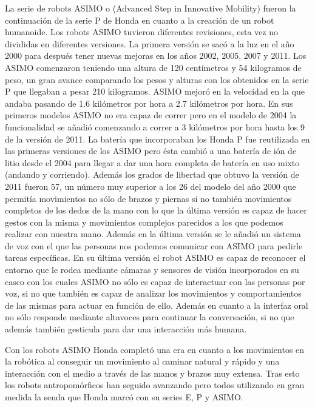 La serie de robots ASIMO o (Advanced Step in Innovative Mobility) fueron la continuación de la serie P de Honda en cuanto a la creación de un robot humanoide. Los robots ASIMO tuvieron diferentes revisiones, esta vez no divididas en diferentes versiones. La primera versión se sacó a la luz en el año 2000 para después tener nuevas mejoras en los años 2002, 2005, 2007 y 2011. Los ASIMO comenzaron teniendo una altura de 120 centímetros y 54 kilogramos de peso, un gran avance comparando los pesos y alturas con los obtenidos en la serie P que llegaban a pesar 210 kilogramos. ASIMO mejoró en la velocidad en la que andaba pasando de 1.6 kilómetros por hora a 2.7 kilómetros por hora. En sus primeros modelos ASIMO no era capaz de correr pero en el modelo de 2004 la funcionalidad se añadió comenzando a correr a 3 kilómetros por hora hasta los 9 de la versión de 2011. La batería que incorporaban los Honda P fue reutilizada en las primeras versiones de los ASIMO pero ésta cambió a una batería de ión de litio desde el 2004 para llegar a dar una hora completa de batería en uso mixto (andando y corriendo). Además los grados de libertad que obtuvo la versión de 2011 fueron 57, un número muy superior a los 26 del modelo del año 2000 que permitía movimientos no sólo de brazos y piernas si no también movimientos completos de los dedos de la mano con lo que la última versión es capaz de hacer gestos con la misma y movimientos complejos parecidos a los que podemos realizar con nuestra mano. Además en la última versión se le añadió un sistema de voz con el que las personas nos podemos comunicar con ASIMO para pedirle tareas específicas. En su última versión el robot ASIMO es capaz de reconocer el entorno que le rodea mediante cámaras y sensores de visión incorporados en su casco con los cuales ASIMO no sólo es capaz de interactuar con las personas por voz, si no que también es capaz de analizar los movimientos y comportamientos de las mismas para actuar en función de ello. Además en cuanto a la interfaz oral no sólo responde mediante altavoces para continuar la conversación, si no que además también gesticula para dar una interacción más humana.

Con los robots ASIMO Honda completó una era en cuanto a los movimientos en la robótica al conseguir un movimiento al caminar natural y rápido y una interacción con el medio a través de las manos y brazos muy extensa. Tras esto los robots antropomórficos han seguido avanzando pero todos utilizando en gran medida la senda que Honda marcó con su series E, P y ASIMO.
